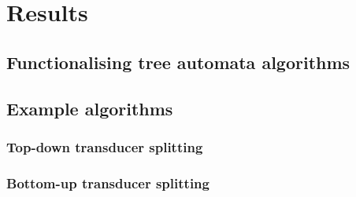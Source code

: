 \section{Results}

\subsection{Functionalising tree automata algorithms}

\subsection{Example algorithms}

\subsubsection{Top-down transducer splitting}

\subsubsection{Bottom-up transducer splitting}


